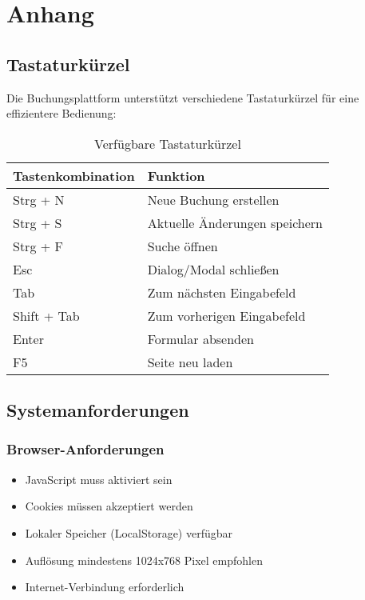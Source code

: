 \section{Anhang}
\label{sec:anhang}

\subsection{Tastaturkürzel}

Die Buchungsplattform unterstützt verschiedene Tastaturkürzel für eine effizientere Bedienung:

\begin{table}[H]
    \centering
    \begin{tabular}{|l|l|}
        \hline
        \textbf{Tastenkombination} & \textbf{Funktion} \\
        \hline
        Strg + N & Neue Buchung erstellen \\
        Strg + S & Aktuelle Änderungen speichern \\
        Strg + F & Suche öffnen \\
        Esc & Dialog/Modal schließen \\
        Tab & Zum nächsten Eingabefeld \\
        Shift + Tab & Zum vorherigen Eingabefeld \\
        Enter & Formular absenden \\
        F5 & Seite neu laden \\
        \hline
    \end{tabular}
    \caption{Verfügbare Tastaturkürzel}
    \label{tab:keyboard-shortcuts}
\end{table}

\subsection{Systemanforderungen}

\subsubsection{Browser-Anforderungen}

\begin{itemize}
    \item JavaScript muss aktiviert sein
    \item Cookies müssen akzeptiert werden
    \item Lokaler Speicher (LocalStorage) verfügbar
    \item Auflösung mindestens 1024x768 Pixel empfohlen
    \item Internet-Verbindung erforderlich
\end{itemize}

